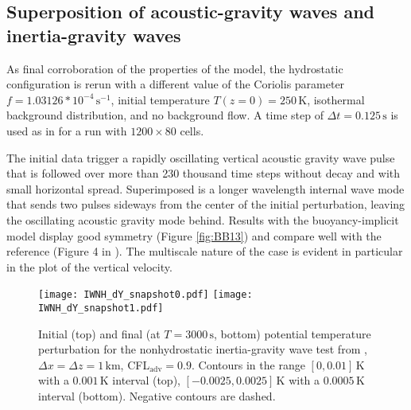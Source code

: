 \documentclass[12pt,a4paper]{article}
\theoremstyle{definition}
\newcommand{\dt}{\Delta t}
\begin{document}
\subsection{Superposition of acoustic-gravity waves and inertia-gravity waves}

As final corroboration of the properties of the model, the hydrostatic configuration is rerun with a different value of the Coriolis parameter $f=1.03126*10^{-4}\,\textrm{s}^{-1}$, initial temperature $T(z=0)=250\,\textrm{K}$, isothermal background distribution, and no background flow. A time step of $\dt=0.125\,\textrm{s}$ is used as in \cite{BaldaufBrdar2013} for a run with $1200\times80$ cells. 

The initial data trigger a rapidly oscillating vertical acoustic gravity wave pulse that is followed over more than 230 thousand time steps without decay and with small horizontal spread. Superimposed is a longer wavelength internal wave mode that sends two pulses sideways from the center of the initial perturbation, leaving the oscillating acoustic gravity mode behind. Results with the buoyancy-implicit model display good symmetry (Figure \ref{fig:BB13}) and compare well with the reference (Figure 4 in \cite{BaldaufBrdar2013}). The multiscale nature of the case is evident in particular in the plot of the vertical velocity.

\begin{figure}
\centering
 \texttt{[image: IWNH\_dY\_snapshot0.pdf]}
 \texttt{[image: IWNH\_dY\_snapshot1.pdf]}
 \caption{Initial (top) and final (at $T=3000\,\textrm{s}$, bottom) potential temperature perturbation for the nonhydrostatic inertia-gravity wave test from \cite{SkamarockKlemp1994}, $\Delta x=\Delta z=1\,\textrm{km}$, CFL$_\textrm{adv}=0.9$. Contours in the range $[0, 0.01]\,\textrm{K}$ with a $0.001\,\textrm{K}$ interval (top), $[-0.0025, 0.0025]\,\textrm{K}$ with a $0.0005\,\textrm{K}$ interval (bottom). Negative contours are dashed.}
 \label{fig:SK94_NH}
\end{figure}
\end{document}

